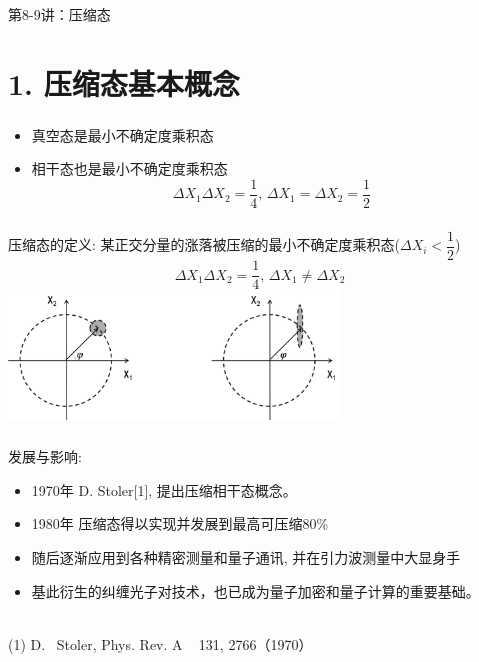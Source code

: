 \begin{frame} [plain]
    \frametitle{}
    \Background[1] 
    \begin{center}
    {\huge 第8-9讲：压缩态}
    \end{center}  
    \addtocounter{framenumber}{-1}   
\end{frame}

\section{1. 压缩态基本概念}

\begin{frame}
    \frametitle{}
    \begin{tcolorbox3}[前情回顾]
     \begin{itemize}
                \item 真空态是最小不确定度乘积态
                \item 相干态也是最小不确定度乘积态
                \[ \Delta X_1 \Delta X_2 =\dfrac{1}{4}, \, \Delta X_1 = \Delta X_2 = \frac{1}{2} \] 
         \end{itemize}
    \end{tcolorbox3}
\end{frame}

\begin{frame}
 \frametitle{}
      \begin{center}
           \begin{tcolorbox2}[0.86]{压缩态的定义:}
            某正交分量的涨落被压缩的最小不确定度乘积态($\Delta X_i < \dfrac{1}{2}$)
            \[ \Delta X_1 \Delta X_2 =\dfrac{1}{4}, \, \Delta X_1 \not = \Delta X_2  \] 
            \centering
            \includegraphics[width=0.66\textwidth]{figs/6.png}
          \end{tcolorbox2}  
      \end{center} 
\end{frame}

\begin{frame}
 \frametitle{}
 发展与影响:
 \begin{itemize}
     \item  1970年 D. Stoler[1], 提出压缩相干态概念。
     \item  1980年 压缩态得以实现并发展到最高可压缩80\%
     \item  随后逐渐应用到各种精密测量和量子通讯, 并在引力波测量中大显身手 
     \item 基此衍生的纠缠光子对技术，也已成为量子加密和量子计算的重要基础。
 \end{itemize}
 ~~ \\ {\vspace*{2.8em}}
 (1) D. ~Stoler, Phys. Rev.  A ~ 131, 2766（1970）    
\end{frame}

